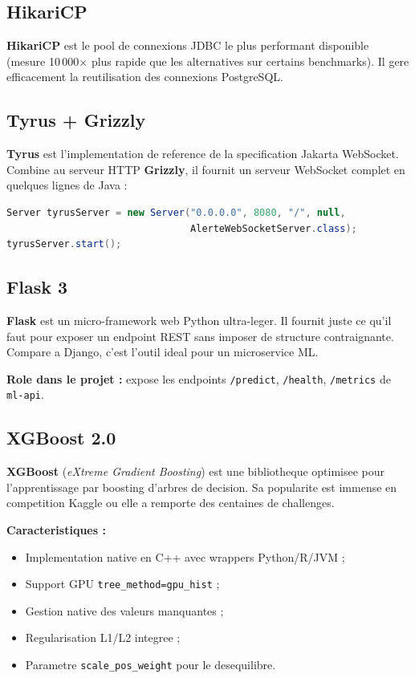 \documentclass[12pt,a4paper,oneside]{report}
\begin{document}
\subsection{HikariCP}

\textbf{HikariCP} est le pool de connexions JDBC le plus performant
disponible (mesure 10\,000$\times$ plus rapide que les alternatives sur
certains benchmarks). Il gere efficacement la reutilisation des connexions
PostgreSQL.

\subsection{Tyrus + Grizzly}

\textbf{Tyrus} est l'implementation de reference de la specification
Jakarta WebSocket. Combine au serveur HTTP \textbf{Grizzly}, il fournit un
serveur WebSocket complet en quelques lignes de Java :

\begin{lstlisting}[language=Java,caption={Demarrage du serveur Tyrus},label=lst:tyrus]
Server tyrusServer = new Server("0.0.0.0", 8080, "/", null,
                                AlerteWebSocketServer.class);
tyrusServer.start();
\end{lstlisting}

\subsection{Flask 3}

\textbf{Flask} est un micro-framework web Python ultra-leger. Il fournit
juste ce qu'il faut pour exposer un endpoint REST sans imposer de structure
contraignante. Compare a Django, c'est l'outil ideal pour un microservice ML.

\textbf{Role dans le projet :} expose les endpoints \texttt{/predict},
\texttt{/health}, \texttt{/metrics} de \texttt{ml-api}.

\subsection{XGBoost 2.0}

\textbf{XGBoost} (\emph{eXtreme Gradient Boosting}) \cite{chen2016xgboost}
est une bibliotheque optimisee pour l'apprentissage par boosting d'arbres
de decision. Sa popularite est immense en competition Kaggle ou elle a
remporte des centaines de challenges.

\textbf{Caracteristiques :}
\begin{itemize}[leftmargin=*]
  \item Implementation native en C++ avec wrappers Python/R/JVM ;
  \item Support GPU \texttt{tree\_method=gpu\_hist} ;
  \item Gestion native des valeurs manquantes ;
  \item Regularisation L1/L2 integree ;
  \item Parametre \texttt{scale\_pos\_weight} pour le desequilibre.
\end{itemize}
\end{document}
